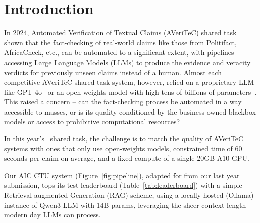 


\section{Introduction}
\label{sec:introduction}
In 2024, Automated Verification of Textual Claims (AVeriTeC) shared task~\cite{schlichtkrull-etal-2024-automated} shown that the fact-checking of real-world claims like those from Politifact, AfricaCheck, etc., can be automated to a significant extent, with pipelines accessing Large Language Models (LLMs) to produce the evidence and veracity verdicts for previously unseen claims instead of a human.
Almost each competitive AVeriTeC shared-task system, however, relied on a proprietary LLM like GPT-4o~\cite{rothermel-etal-2024-infact,ullrich-etal-2024-aic} or an open-weights model with high tens of billions of parameters~\cite{yoon-etal-2024-hero}.
This raised a concern -- can the fact-checking process be automated in a way accessible to masses, or is its quality conditioned by the business-owned blackbox models or access to prohibitive computational resources?

In this year's~\averitec{} shared task, the challenge is to match the quality of AVeriTeC systems with ones that only use open-weights models, constrained time of 60 seconds per claim on average, and a fixed compute of a single 20GB A10 GPU.

Our AIC CTU system (Figure~\ref{fig:pipeline}), adapted for \averitec{} from our last year submission, tops its test-leaderboard (Table~\ref{tab:leaderboard}) with a simple Retrieval-augmented Generation (RAG) scheme, using a locally hosted (Ollama) instance of Qwen3 LLM with 14B params, leveraging the sheer context length modern day LLMs can process.

